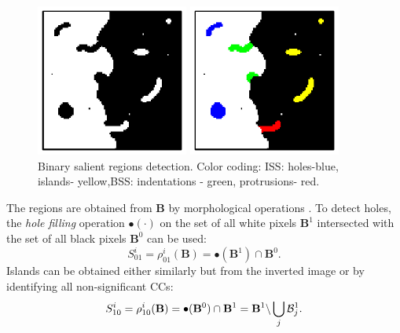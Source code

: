 \documentclass[conference,compsoc]{IEEEtran}
\newcommand {\be}{\begin{equation}}
\newcommand {\ee}{\end{equation}}
\def\B{{\mathbf B}}
\begin{document}
\begin{figure}[htb]
\begin{minipage}[b]{.49\linewidth}
  \centering
  \centerline{\includegraphics[width=5cm]{binary_marks}}

\end{minipage}
\begin{minipage}[b]{0.49\linewidth}
  \centering
  \centerline{\includegraphics[width=5cm]{binary_marks_clean_color_coded}}

\end{minipage}
\caption{Binary salient regions detection.
Color coding: ISS: holes-blue, islands- yellow,BSS:
indentations - green, protrusions- red. }
\label{fig:binary_sal}
\end{figure}
The regions are obtained from $\B$ by morphological operations \cite{Soille}. To detect holes, the {\em hole filling} operation $\bullet (\cdot)$ on the set of all white pixels $\B ^1$ intersected with the set of all black pixels $\B^0$ can be used:
\be
S^i_{01} = \rho^i_{01}(\B)= \bullet(\B ^1) \cap \B^0 \label{eqn:sal:inn:01}.
\ee
Islands can be obtained either similarly but from the inverted image or by identifying all non-significant CCs:
\be
S^i_{10} = \rho^i_{10}(\B)= \bullet(\B ^0) \cap \B^1 = \B^1 \backslash \bigcup_j{{\cal B}_j^1} \label{eqn:sal:inn:10}.
\ee
\end{document}
